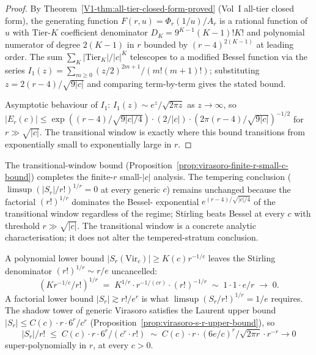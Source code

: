 \begin{proof}
By Theorem~\ref{V1-thm:all-tier-closed-form-proved} (Vol~I
all-tier closed form), the
generating function $F(r, u) = \Phi_r(1/u) / A_r$ is a rational
function of $u$ with Tier-$K$ coefficient denominator
$D_K = 9^{K-1} (K-1)! K!$ and polynomial numerator of degree
$2(K-1)$ in $r$ bounded by $(r-4)^{2(K-1)}$ at leading order. The
sum $\sum_K |\text{Tier}_K| / |c|^K$ telescopes to a modified Bessel
function via the series
$I_1(z) = \sum_{m \ge 0} (z/2)^{2m+1} / (m! (m+1)!)$; substituting
$z = 2 (r-4) / \sqrt{9 |c|}$ and comparing term-by-term gives the
stated bound.

Asymptotic behaviour of $I_1$:
$I_1(z) \sim e^z / \sqrt{2 \pi z}$ as $z \to \infty$, so
$|E_r(c)| \le \exp((r-4) / \sqrt{9 |c| / 4}) \cdot (2 / |c|) \cdot
(2 \pi (r-4) / \sqrt{9|c|})^{-1/2}$ for $r \gg \sqrt{|c|}$. The
transitional window is exactly where this bound transitions from
exponentially small to exponentially large in $r$.
\end{proof}

\begin{remark}
\label{rem:virasoro-finite-r-window}
The transitional-window bound
(Proposition~\ref{prop:virasoro-finite-r-small-c-bound}) completes
the finite-$r$ small-$|c|$ analysis. The tempering conclusion
($\limsup (|S_r|/r!)^{1/r} = 0$ at every generic $c$) remains
unchanged because the factorial $(r!)^{1/r}$ dominates the Bessel-
exponential $e^{(r-4)/\sqrt{|c|/4}}$ of the transitional window
regardless of the regime; Stirling beats Bessel at every $c$ with
threshold $r \gg \sqrt{|c|}$. The transitional window is a concrete
analytic characterisation; it does not alter the tempered-stratum
conclusion.
\end{remark}

\begin{remark}
\label{rem:stirling-error-first-principles}
A polynomial lower bound
$\lvert S_r(\mathrm{Vir}_c) \rvert \ge K(c) r^{-1/c}$ leaves the
Stirling denominator $(r!)^{1/r}\sim r/e$ uncancelled:
\[
 (K r^{-1/c} / r!)^{1/r}
 \;=\;
 K^{1/r} \cdot r^{-1/(c r)}
 \cdot
 (r!)^{-1/r}
 \;\sim\;
 1 \cdot 1 \cdot
 e / r
 \;\to\;
 0.
\]
A factorial lower bound $\lvert S_r \rvert \gtrsim r! / e^r$ is what
$\limsup (S_r / r!)^{1/r} = 1/e$ requires. The shadow tower of generic
Virasoro satisfies the Laurent upper bound
$\lvert S_r \rvert \le C(c) \cdot r \cdot 6^r / c^r$
(Proposition~\ref{prop:virasoro-s-r-upper-bound}), so
\[
 \lvert S_r \rvert / r!
 \;\le\;
 C(c) \cdot r \cdot 6^r / (c^r \cdot r!)
 \;\sim\;
 C(c) \cdot r \cdot (6 e / c)^r / \sqrt{2 \pi r}
 \cdot r^{-r} \to 0
\]
super-polynomially in $r$, at every $c > 0$.
\end{remark}

